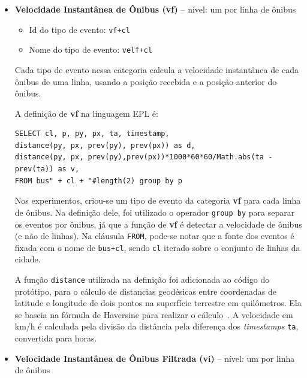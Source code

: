 \begin{itemize}    
    \item \textbf{Velocidade Instantânea de Ônibus (vf)} -- nível: um por linha de ônibus
    \begin{itemize}
        \item  Id do tipo de evento: \texttt{vf+cl}%
        \item Nome do tipo de evento: \texttt{velf+cl}%
    \end{itemize}
   
    
    
    Cada tipo de evento nessa categoria calcula a velocidade instantânea de cada ônibus de uma linha, usando a posição recebida e a posição anterior do ônibus. %
    
    A definição de \textbf{vf} na linguagem EPL é:
\begin{verbatim}
SELECT cl, p, py, px, ta, timestamp, 
distance(py, px, prev(py), prev(px)) as d,
distance(py, px, prev(py),prev(px))*1000*60*60/Math.abs(ta - prev(ta)) as v,
FROM bus" + cl + "#length(2) group by p 
\end{verbatim}

    Nos experimentos, criou-se um tipo de evento da categoria \textbf{vf} para cada linha de ônibus. Na definição dele, foi utilizado o operador \texttt{group by} para separar os eventos por ônibus, já que a função de \textbf{vf} é detectar a velocidade de ônibus (e não de linhas). Na cláusula \texttt{FROM}, pode-se notar que a fonte dos eventos é fixada com o nome de \texttt{bus+cl}, sendo \texttt{cl} iterado sobre o conjunto de linhas da cidade. 
    
    A função \texttt{distance} utilizada na definição foi adicionada ao código do protótipo, para o cálculo de distancias geodésicas entre coordenadas de latitude e longitude de dois pontos na superfície terrestre em quilômetros. Ela se baseia na fórmula de Haversine para realizar o cálculo~\citep{Haversine}. A velocidade em km/h é calculada pela divisão da distância pela diferença dos \textit{timestamps} \texttt{ta}, convertida para horas.
 
    \item \textbf{Velocidade Instantânea de Ônibus Filtrada (vi)}  -- nível: um por linha de ônibus
    

\end{itemize}
